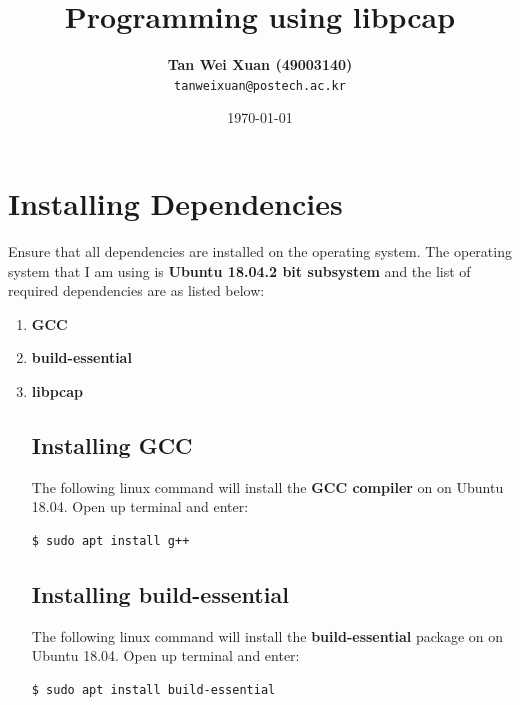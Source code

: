 \documentclass[a4paper,11pt]{article}
\begin{document}
\title{\vspace{-1.0cm}\textbf{Programming using libpcap}}
\author{
  \textbf{Tan Wei Xuan (49003140)}\\
  \texttt{tanweixuan@postech.ac.kr}
}
\date{\today}
\maketitle

\section{Installing Dependencies}
Ensure that all dependencies are installed on the operating system. The operating system that I am using is \textbf{Ubuntu 18.04.2 bit subsystem} and the list of required dependencies are as listed below:
\begin{enumerate}
\item \textbf{GCC}
\item \textbf{build-essential}
\item \textbf{libpcap}

\subsection{Installing GCC}
The following linux command will install the \textbf{GCC compiler} on on Ubuntu 18.04. Open up terminal and enter:
\begin{mdframed}[backgroundcolor=light-gray, roundcorner=30pt,leftmargin=1, rightmargin=1, innerleftmargin=5, innertopmargin=-3,innerbottommargin=5, outerlinewidth=1, linecolor=light-gray]
\begin{lstlisting}
$ sudo apt install g++
\end{lstlisting}
\end{mdframed}
\subsection{Installing build-essential}
The following linux command will install the \textbf{build-essential} package on on Ubuntu 18.04. Open up terminal and enter:
\begin{mdframed}[backgroundcolor=light-gray, roundcorner=30pt,leftmargin=1, rightmargin=1, innerleftmargin=5, innertopmargin=-3,innerbottommargin=5, outerlinewidth=1, linecolor=light-gray]
\begin{lstlisting}
$ sudo apt install build-essential
\end{lstlisting}
\end{mdframed}

\end{enumerate}
\end{document}
